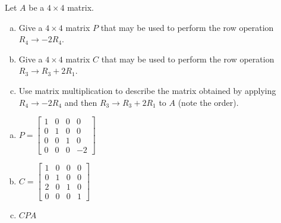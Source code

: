 
\begin{exerciseStatement}


Let \(A\) be a \(4 \times 4\) matrix.


\begin{enumerate}[(a)]
\item Give a \(4 \times 4\) matrix \(P\) that may be used to perform the row operation \( R_4 \to -2R_4 \).
\item Give a \(4 \times 4\) matrix \(C\) that may be used to perform the row operation \( R_3 \to R_3 + 2R_1 \).
\item Use matrix multiplication to describe the matrix obtained by applying \( R_4 \to -2R_4 \) and then \( R_3 \to R_3 + 2R_1 \) to \(A\) (note the order). 
\end{enumerate}
    
\end{exerciseStatement}
    
\begin{exerciseAnswer} 

\begin{enumerate}[(a)]
\item \(P= \left[\begin{array}{cccc}
1 & 0 & 0 & 0 \\
0 & 1 & 0 & 0 \\
0 & 0 & 1 & 0 \\
0 & 0 & 0 & -2
\end{array}\right] \)
\item \(C= \left[\begin{array}{cccc}
1 & 0 & 0 & 0 \\
0 & 1 & 0 & 0 \\
2 & 0 & 1 & 0 \\
0 & 0 & 0 & 1
\end{array}\right] \)
\item \(CPA\)
\end{enumerate}
    
\end{exerciseAnswer}
    
